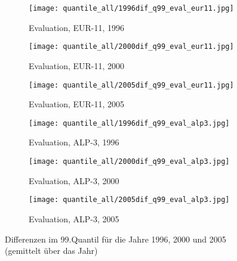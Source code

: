 	\begin{figure}
	\begin{subfigure}{0.32\textwidth}
		\texttt{[image: quantile\_all/1996dif\_q99\_eval\_eur11.jpg]}
		\caption{Evaluation, EUR-11, 1996}
	\end{subfigure}
	\begin{subfigure}{0.32\textwidth}
		\texttt{[image: quantile\_all/2000dif\_q99\_eval\_eur11.jpg]}
		\caption{Evaluation, EUR-11, 2000}
	\end{subfigure}
	\begin{subfigure}{0.32\textwidth}
		\texttt{[image: quantile\_all/2005dif\_q99\_eval\_eur11.jpg]}
		\caption{Evaluation, EUR-11, 2005}
	\end{subfigure}
	\begin{subfigure}{0.32\textwidth}
		\texttt{[image: quantile\_all/1996dif\_q99\_eval\_alp3.jpg]}
		\caption{Evaluation, ALP-3, 1996}
	\end{subfigure}
	\begin{subfigure}{0.32\textwidth}
		\texttt{[image: quantile\_all/2000dif\_q99\_eval\_alp3.jpg]}
		\caption{Evaluation, ALP-3, 2000}
	\end{subfigure}
	\begin{subfigure}{0.32\textwidth}
		\texttt{[image: quantile\_all/2005dif\_q99\_eval\_alp3.jpg]}
		\caption{Evaluation, ALP-3, 2005}
	\end{subfigure}
	\caption{Differenzen im 99.Quantil für die Jahre 1996, 2000 und 2005 (gemittelt über das Jahr)}
	\label{fig:quantile_alp3}
\end{figure}

